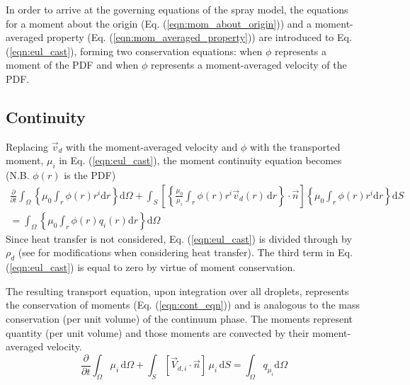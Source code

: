 \documentclass[a4paper,10pt]{article}
\begin{document}
In order to arrive at the governing equations of the spray model, the equations for a moment about the origin (Eq. (\ref{eqn:mom_about_origin})) and a moment-averaged property (Eq. (\ref{eqn:mom_averaged_property})) are introduced to Eq. (\ref{eqn:eul_cast}), forming two conservation equations: when $\phi$ represents a moment of the PDF and when $\phi$ represents a moment-averaged velocity of the PDF.



\subsection{Continuity}
Replacing $\vec{v}_d$ with the moment-averaged velocity and $\phi$ with the transported moment, $\mu_i$ in Eq. (\ref{eqn:eul_cast}), the moment continuity equation becomes (N.B. $\phi(r)$ is the PDF)
\begin{multline}
\frac{\partial}{\partial t} \int_{\Omega} \left\lbrace \mu_{0} \int_{r} \phi(r) r^{i} \mathrm{d}r \right\rbrace  \mathrm{d}\Omega 
+ \int_{S} \left[\left\lbrace\frac{\mu_0}{\mu_i} \int_{r} \phi(r) r^{i} \vec{v}_d(r) \,\mathrm{d}r \right\rbrace \cdot \vec{n}\right] \left\lbrace \mu_{0} \int_{r} \phi(r) r^{i} \mathrm{d}r \right\rbrace \mathrm{d}S \\
= \int_{\Omega} \left\lbrace \mu_{0} \int_{r} \phi(r) q_{i}(r) \mathrm{d}r \right\rbrace \mathrm{d}\Omega
\end{multline}
Since heat transfer is not considered, Eq. (\ref{eqn:eul_cast}) is divided through by $\rho_d$ (see \cite{watkins2006} for modifications when considering heat transfer). The third term in Eq. (\ref{eqn:eul_cast}) is equal to zero by virtue of moment conservation.

The resulting transport equation, upon integration over all droplets, represents the conservation of moments (Eq. (\ref{eqn:cont_eqn})) and is analogous to the mass conservation (per unit volume) of the continuum phase.  The moments represent quantity (per unit volume) and those moments are convected by their moment-averaged velocity.
\begin{equation} \label{eqn:cont_eqn}
\frac{\partial}{\partial t} \int_{\Omega} \mu_{i}\, \mathrm{d}\Omega
+ \int_{S} [\vec{V}_{d,i} \cdot \vec{n}] \,\mu_{i}\, \mathrm{d}S
= \int_{\Omega} q_{\mu_{i}} \mathrm{d}\Omega
\end{equation}
\end{document}
